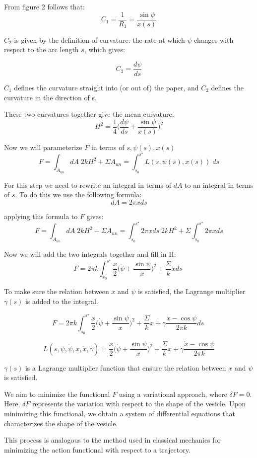 \documentclass[12pt]{article}
\begin{document}
From figure 2 follows that:
$$
C_1=\frac{1}{R_1}=\frac{\sin{\psi}}{x(s)}
$$

$C_2$ is given by the definition of curvature: the rate at which $\psi$ changes with respect to the arc length $s$, which gives:

$$
C_2=\frac{d\psi}{ds}
$$

$C_1$ defines the curvature straight into (or out of) the paper, and $C_2$ defines the curvature in the direction of s. 

These two curvatures together give the mean curvature:
$$
H^2=\frac{1}{4}\bigg(\frac{d\psi}{ds}+\frac{\sin{\psi}}{x(s)}\bigg)^2
$$


Now we will parameterize $F$ in terms of $s, \psi(s), x(s)$
$$
F = \int_{A_{un}} dA \; 2kH^2  + \Sigma A_{un} = \int_{s_0}^{s^\star} L(s,\psi(s),x(s)) \; ds
$$


For this step we need to rewrite an integral in terms of $dA$ to an integral in terms of $s$. To do this we use the following formula:
$$
dA=2\pi xds
$$

applying this formula to $F$ gives:
$$
F = \int_{A_{un}} dA \; 2kH^2  + \Sigma A_{un} = \int_{s_0}^{s^\star} 2\pi xds \; 2kH^2 + \Sigma \int_{s_0}^{s^\star} 2\pi x  ds
$$

Now we will add the two integrals together and fill in H:
$$
F = 2\pi k \int_{s_0}^{s^\star} \frac{x}{2} \bigg(\dot{\psi}+\frac{\sin{\psi}}{x}\bigg)^2  + \frac{\Sigma}{k} x ds \;
$$

To make sure the relation between $x$ and $\psi$ is satisfied, the Lagrange multiplier $\gamma(s)$ is added to the integral.

$$
F = 2\pi k \int_{s_0}^{s^\star} \frac{x}{2} \bigg(\dot{\psi}+\frac{\sin{\psi}}{x}\bigg)^2  + \frac{\Sigma}{k} x +\gamma\frac{\dot{x}-\cos \psi}{2\pi k}ds\;
$$
 

$$
L(s,\psi,\dot{\psi},x,\dot{x},\gamma) = \frac{x}{2} \bigg(\dot{\psi}+\frac{\sin \psi}{x}\bigg)^2 + \frac{\Sigma}{k} x + \gamma\frac{\dot{x}-\cos \psi}{2\pi k}
$$

$\gamma(s)$ is a Lagrange multiplier function that ensure the relation between $x$ and $\psi$ is satisfied.


We aim to minimize the functional \( F \) using a variational approach, where \( \delta F = 0 \). Here, \( \delta F \) represents the variation with respect to the shape of the vesicle. Upon minimizing this functional, we obtain a system of differential equations that characterizes the shape of the vesicle.

This process is analogous to the method used in classical mechanics for minimizing the action functional with respect to a trajectory.
\end{document}
